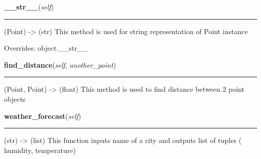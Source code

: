     \vspace{0.5ex}

\hspace{.8\funcindent}\begin{boxedminipage}{\funcwidth}

    \raggedright \textbf{\_\_str\_\_}(\textit{self})

    \vspace{-1.5ex}

    \rule{\textwidth}{0.5\fboxrule}
\setlength{\parskip}{2ex}
    (Point) -{\textgreater} (str) This method is used for string 
    representation of Point instance

\setlength{\parskip}{1ex}
      Overrides: object.\_\_str\_\_

    \end{boxedminipage}

    \label{point:Point:find_distance}

    \vspace{0.5ex}

\hspace{.8\funcindent}\begin{boxedminipage}{\funcwidth}

    \raggedright \textbf{find\_distance}(\textit{self}, \textit{another\_point})

    \vspace{-1.5ex}

    \rule{\textwidth}{0.5\fboxrule}
\setlength{\parskip}{2ex}
    (Point, Point) -{\textgreater} (float) This method is used to find 
    distance between 2 point objects

\setlength{\parskip}{1ex}
    \end{boxedminipage}

    \label{point:Point:weather_forecast}

    \vspace{0.5ex}

\hspace{.8\funcindent}\begin{boxedminipage}{\funcwidth}

    \raggedright \textbf{weather\_forecast}(\textit{self})

    \vspace{-1.5ex}

    \rule{\textwidth}{0.5\fboxrule}
\setlength{\parskip}{2ex}
    (str) -{\textgreater} (list) This function inputs  name of a city and 
    outputs list of tuples ( humidity, temperature)

\setlength{\parskip}{1ex}
    \end{boxedminipage}

